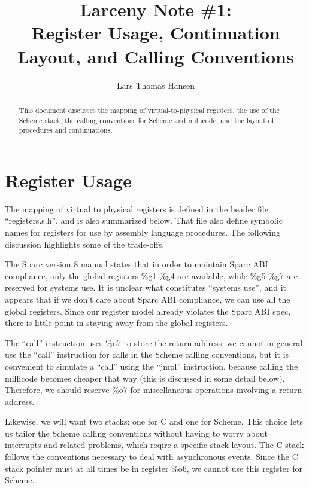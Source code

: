


\title{Larceny Note \#1: \\
       Register Usage, Continuation Layout, and Calling Conventions}
\author{Lars Thomas Hansen}


\maketitle

\begin{abstract}
This document discusses the mapping of virtual-to-physical registers, the
use of the Scheme stack, the calling conventions for Scheme and millicode,
and the layout of procedures and continuations.
\end{abstract}

\section{Register Usage}

The mapping of virtual to physical registers is defined in the header
file ``registers.s.h'', and is also summarized below. That file
also define symbolic names for registers for use by assembly language
procedures.  The following discussion highlights some of the
trade-offs.

The Sparc version 8 manual states that in order to maintain Sparc ABI
compliance, only the global registers \%g1-\%g4 are available, while
\%g5-\%g7 are reserved for systems use. It is unclear what constitutes
``systems use'', and it appears that if we don't care about Sparc ABI
compliance, we can use all the global registers. Since our register
model already violates the Sparc ABI spec, there is little point in
staying away from the global registers.

The ``call'' instruction uses \%o7 to store the return address; we
cannot in general use the ``call'' instruction for calls in the Scheme calling
conventions, but it is convenient to simulate a ``call'' using
the ``jmpl'' instruction, because calling the millicode becomes
cheaper that way (this is discussed in some detail below).  Therefore,
we should reserve \%o7 for miscellaneous operations involving a return
address.

Likewise, we will want two stacks: one for C and one for Scheme. This
choice lets us tailor the Scheme calling conventions without having to
worry about interrupts and related problems, which reqire a specific
stack layout. The C stack follows the conventions necessary to deal
with asynchronous events. Since the C stack pointer must at all times
be in register \%o6, we cannot use this register for Scheme.

